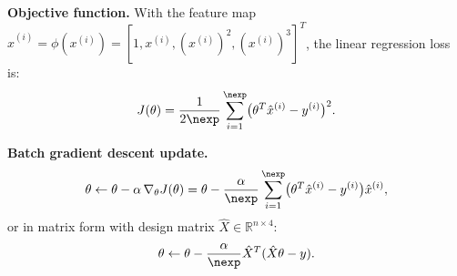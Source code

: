 \begin{answer}
\textbf{Objective function.} With the feature map $\hat{x}^{(i)} = \phi(x^{(i)}) = [1, x^{(i)}, (x^{(i)})^2, (x^{(i)})^3]^T$, the linear regression loss is:
\[
J(\theta) = \frac{1}{2\nexp}\sum_{i=1}^{\nexp}\bigl(\theta^T\hat{x}^{(i)} - y^{(i)}\bigr)^2.
\]

\textbf{Batch gradient descent update.}
\[
\theta \leftarrow \theta - \alpha\,\nabla_\theta J(\theta)
= \theta - \frac{\alpha}{\nexp}\sum_{i=1}^{\nexp}\bigl(\theta^T\hat{x}^{(i)} - y^{(i)}\bigr)\hat{x}^{(i)},
\]
or in matrix form with design matrix $\hat{X}\in\mathbb{R}^{n\times 4}$:
\[
\theta \leftarrow \theta - \frac{\alpha}{\nexp}\hat{X}^T(\hat{X}\theta - y).
\]
\end{answer}

